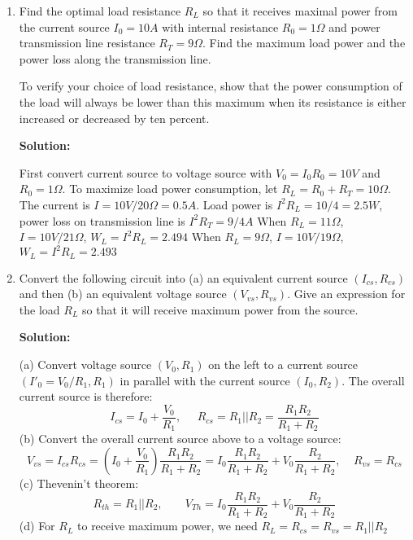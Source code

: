 \begin{enumerate}
\item Find the optimal load resistance $R_L$ so that it receives maximal
power from the current source $I_0=10A$ with internal resistance 
$R_0=1\Omega$ and power transmission line resistance $R_T=9\Omega$. 
Find the maximum load power and the power loss along the transmission 
line.


To verify your choice of load resistance, show that the power consumption
of the load will always be lower than this maximum when its resistance is 
either increased or decreased by ten percent.

 {\bf Solution:}

  First convert current source to voltage source with $V_0=I_0 R_0=10V$
  and $R_0=1 \Omega$. To maximize load power consumption, let 
  $R_L=R_0+R_T=10 \Omega$. The current is $I=10V/20\Omega=0.5A$. Load power 
  is $I^2R_L=10/4=2.5W$, power loss on transmission line is $I^2R_T=9/4A$
  When $R_L=11\Omega$, $I=10V/21\Omega$, $W_L=I^2 R_L=2.494$
  When $R_L=9\Omega$, $I=10V/19\Omega$, $W_L=I^2 R_L=2.493$

\item Convert the following circuit into (a) an equivalent current 
  source $(I_{cs}, R_{cs})$ and then (b) an equivalent voltage source
  $(V_{vs}, R_{vs})$. Give an expression for the load $R_L$ so that it 
  will receive maximum power from the source.


 {\bf Solution:}
 
 (a) Convert voltage source $(V_0,R_1)$ on the left to a current source
     $(I'_0=V_0/R_1, R_1)$ in parallel with the current source $(I_0,R_2)$.
     The overall current source is therefore:
     \[ 
     I_{cs}=I_0+\frac{V_0}{R_1},\;\;\;\;\;
     R_{cs}=R_1||R_2=\frac{R_1 R_2}{R_1+R_2} 
     \]
 (b) Convert the overall current source above to a voltage source:
     \[ 
     V_{vs}=I_{cs} R_{cs}=(I_0+\frac{V_0}{R_1})\frac{R_1 R_2}{R_1+R_2} 
     =I_0\frac{R_1 R_2}{R_1+R_2}+V_0\frac{R_2}{R_1+R_2},\;\;\;\;
     R_{vs}=R_{cs}
     \]
 (c) Thevenin't theorem:
     \[
     R_{th}=R_1||R_2,\;\;\;\;\;\;\;V_{Th}=I_0\frac{R_1R_2}{R_1+R_2}+V_0\frac{R_2}{R_1+R_2}
     \]
 (d) For $R_L$ to receive maximum power, we need $R_L=R_{cs}=R_{vs}=R_1||R_2$
   


\end{enumerate}
